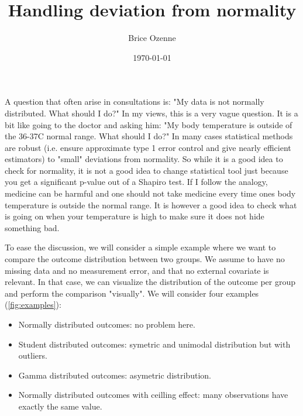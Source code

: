 \documentclass[12pt]{article}
\author{Brice Ozenne}
\date{\today}
\title{Handling deviation from normality}
\begin{document}
\maketitle
\noindent A question that often arise in consultations is: \newline
"My data is not normally distributed. What should I do?" \newline In
my views, this is a very vague question. It is a bit like going to the
doctor and asking him: \newline "My body temperature is outside of the
36-37\textdegree C normal range. What should I do?" In many cases
statistical methods are robust (i.e. ensure approximate type 1 error
control and give nearly efficient estimators) to "small" deviations
from normality. So while it is a good idea to check for normality, it
is not a good idea to change statistical tool just because you get a
significant p-value out of a Shapiro test. If I follow the analogy,
medicine can be harmful and one should not take medicine every time
ones body temperature is outside the normal range. It is however a
good idea to check what is going on when your temperature is high to
make sure it does not hide something bad.

\bigskip

To ease the discussion, we will consider a simple example where we
want to compare the outcome distribution between two groups. We assume
to have no missing data and no measurement error, and that no external
covariate is relevant. In that case, we can visualize the distribution
of the outcome per group and perform the comparison "visually". We
will consider four examples (\autoref{fig:examples}):
\begin{itemize}
\item Normally distributed outcomes: no problem here.
\item Student distributed outcomes: symetric and unimodal distribution but with outliers.
\item Gamma distributed outcomes: asymetric distribution.
\item Normally distributed outcomes with ceilling effect: many observations have exactly the same value.
\end{itemize}


\clearpage

\vfill
\end{document}
